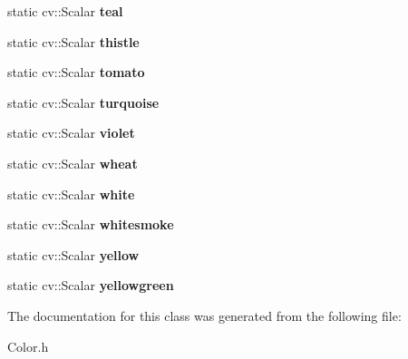 \begin{DoxyCompactItemize}
static cv\+::\+Scalar {\bfseries teal}
\item 
\mbox{\label{classColor_a918d068eecab159a0b6e3b06f4f9ceec}} 
static cv\+::\+Scalar {\bfseries thistle}
\item 
\mbox{\label{classColor_a4e911f81c2ca3ff575662ccebe65ea7f}} 
static cv\+::\+Scalar {\bfseries tomato}
\item 
\mbox{\label{classColor_a99e39964419380138aefabb3cccc1e48}} 
static cv\+::\+Scalar {\bfseries turquoise}
\item 
\mbox{\label{classColor_ad9ec404fde929af5e6c2a9c5124d0385}} 
static cv\+::\+Scalar {\bfseries violet}
\item 
\mbox{\label{classColor_a9da7a00c41781f1ba29d7526850129b4}} 
static cv\+::\+Scalar {\bfseries wheat}
\item 
\mbox{\label{classColor_a41a642b753dcc90b78b9f3e1c8d0e464}} 
static cv\+::\+Scalar {\bfseries white}
\item 
\mbox{\label{classColor_af4eea4e30f8cbf0236a1f8d500e69eca}} 
static cv\+::\+Scalar {\bfseries whitesmoke}
\item 
\mbox{\label{classColor_a9881d6458a7567616ecc52d669318937}} 
static cv\+::\+Scalar {\bfseries yellow}
\item 
\mbox{\label{classColor_ad68dd4b7603c9e4fd4c60b8b5ad06974}} 
static cv\+::\+Scalar {\bfseries yellowgreen}
\end{DoxyCompactItemize}


The documentation for this class was generated from the following file\+:\begin{DoxyCompactItemize}
\item 
Color.\+h\end{DoxyCompactItemize}
